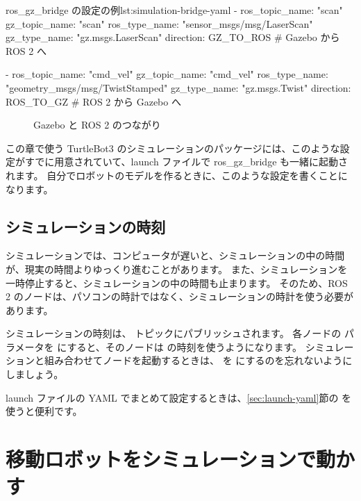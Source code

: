 \begin{codelisting}{ros\_gz\_bridge の設定の例}{lst:simulation-bridge-yaml}
- ros_topic_name: "scan"
  gz_topic_name: "scan"
  ros_type_name: "sensor_msgs/msg/LaserScan"
  gz_type_name: "gz.msgs.LaserScan"
  direction: GZ_TO_ROS        # Gazebo から ROS 2 へ

- ros_topic_name: "cmd_vel"
  gz_topic_name: "cmd_vel"
  ros_type_name: "geometry_msgs/msg/TwistStamped"
  gz_type_name: "gz.msgs.Twist"
  direction: ROS_TO_GZ        # ROS 2 から Gazebo へ
\end{codelisting}

\begin{figure}[htbp]
  \centering
  
  \caption{Gazebo と ROS 2 のつながり}
  \label{fig:simulation-bridge}
\end{figure}

この章で使う TurtleBot3 のシミュレーションのパッケージには、このような設定がすでに用意されていて、launch ファイルで ros\_gz\_bridge も一緒に起動されます。
自分でロボットのモデルを作るときに、このような設定を書くことになります。

\subsection{シミュレーションの時刻}

シミュレーションでは、コンピュータが遅いと、シミュレーションの中の時間が、現実の時間よりゆっくり進むことがあります。
また、シミュレーションを一時停止すると、シミュレーションの中の時間も止まります。
そのため、ROS 2 のノードは、パソコンの時計ではなく、シミュレーションの時計を使う必要があります。

シミュレーションの時刻は、 トピックにパブリッシュされます。
各ノードの  パラメータを  にすると、そのノードは  の時刻を使うようになります。
シミュレーションと組み合わせてノードを起動するときは、 を  にするのを忘れないようにしましょう。


launch ファイルの YAML でまとめて設定するときは、\ref{sec:launch-yaml}節の \cmd{/**} を使うと便利です。

\section{移動ロボットをシミュレーションで動かす}
\label{sec:simulation-turtlebot3}

